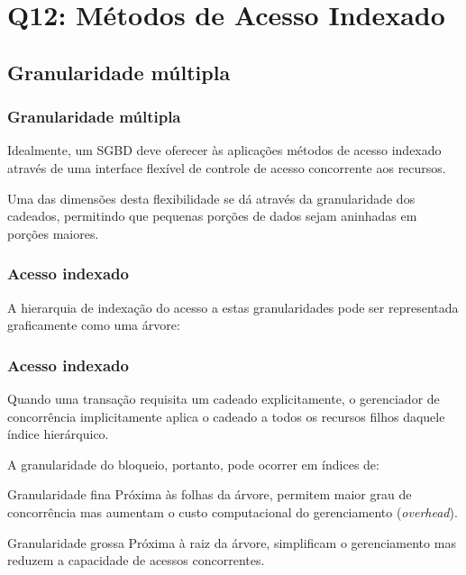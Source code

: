 \documentclass{beamer}
\begin{document}
\section{Q12: Métodos de Acesso Indexado}

\subsection{Granularidade múltipla}

\begin{frame}
    \frametitle{Granularidade múltipla}
    
    Idealmente, um SGBD deve oferecer às aplicações métodos de acesso indexado através de uma interface flexível de controle de acesso concorrente aos recursos.
    
    \medskip
    Uma das dimensões desta flexibilidade se dá através da granularidade dos cadeados, permitindo que pequenas porções de dados sejam aninhadas em porções maiores.
\end{frame}


\begin{frame}
    \frametitle{Acesso indexado}    
    A hierarquia de indexação do acesso a estas granularidades pode ser representada graficamente como uma árvore:
    
    \medskip
    
\end{frame}
    
    
\begin{frame}
    \frametitle{Acesso indexado}
    
    Quando uma transação requisita um cadeado explicitamente, o gerenciador de concorrência implicitamente aplica o cadeado a todos os recursos filhos daquele índice hierárquico.
    
    \medskip
    A granularidade do bloqueio, portanto, pode ocorrer em índices de:
    
    \medskip
    \begin{block}{Granularidade fina}
        Próxima às folhas da árvore, permitem maior grau de concorrência mas aumentam o custo computacional do gerenciamento (\emph{overhead}).
    \end{block}

    \medskip
    \begin{block}{Granularidade grossa}
        Próxima à raiz da árvore, simplificam o gerenciamento mas reduzem a capacidade de acessos concorrentes.
    \end{block}
\end{frame}
\end{document}
